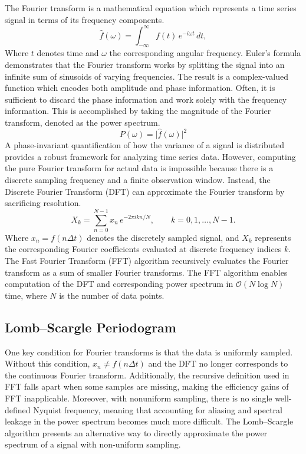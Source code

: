 \documentclass[preprint]{aastex701}
\begin{document}
The Fourier transform is a mathematical equation which represents a time series signal in terms of its frequency components. 
\begin{equation}
\hat{f}(\omega) = \int_{-\infty}^{\infty} f(t)\, e^{-i \omega t}\, dt,
\end{equation}
Where $t$ denotes time and $\omega$ the corresponding angular frequency. \citep{bracewell2000fourier} Euler's formula demonstrates that the Fourier transform works by splitting the signal into an infinite sum of sinusoids of varying frequencies. The result is a complex-valued function which encodes both amplitude and phase information. Often, it is sufficient to discard the phase information and work solely with the frequency information. This is accomplished by taking the magnitude of the Fourier transform, denoted as the power spectrum. \citep{bracewell2000fourier}
\begin{equation}
P(\omega) = \lvert \hat{f}(\omega) \rvert^2
\end{equation}
A phase-invariant quantification of how the variance of a signal is distributed provides a robust framework for analyzing time series data. However, computing the pure Fourier transform for actual data is impossible because there is a discrete sampling frequency and a finite observation window. Instead, the Discrete Fourier Transform (DFT) can approximate the Fourier transform by sacrificing resolution. \citep{bracewell2000fourier}
\begin{equation}
X_k = \sum_{n=0}^{N-1} x_n \, e^{-2\pi i k n / N},
\qquad k = 0, 1, \ldots, N-1.
\end{equation}
Where $x_n = f(n\Delta t)$ denotes the discretely sampled signal, and $X_k$ represents the corresponding Fourier coefficients evaluated at discrete frequency indices $k$. The Fast Fourier Transform (FFT) algorithm recursively evaluates the Fourier transform as a sum of smaller Fourier transforms. The FFT algorithm enables computation of the DFT and corresponding power spectrum in $\mathcal{O}(N \log N)$ time, where $N$ is the number of data points. \citep{bergland1969guided} 

\subsection{Lomb--Scargle Periodogram}

One key condition for Fourier transforms is that the data is uniformly sampled. Without this condition, $x_n \neq f(n\Delta t)$ and the DFT no longer corresponds to the continuous Fourier transform. Additionally, the recursive definition used in FFT falls apart when some samples are missing, making the efficiency gains of FFT inapplicable. Moreover, with nonuniform sampling, there is no single well-defined Nyquist frequency, meaning that accounting for aliasing and spectral leakage in the power spectrum becomes much more difficult. The Lomb--Scargle algorithm presents an alternative way to directly approximate the power spectrum of a signal with non-uniform sampling. \citep{lomb1976}
\end{document}

